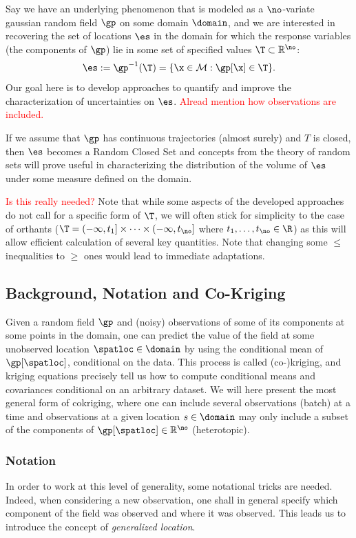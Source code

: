 Say we have an underlying phenomenon that is modeled as a $\no$-variate gaussian random field $\gp$ on some domain $\domain$, 
and we are interested in recovering the set of locations $\es$ in the domain for which the response variables (the components of $\gp$) lie in some set of specified values $\T\subset \mathbb{R}^{\no}$:
$$
\es:=\gp^{-1}(\T)=\{\x \in \mathcal{M}: \gp[\x] \in \T\}.
$$
Our goal here is to develop approaches to quantify and improve the
characterization of uncertainties on $\es$. \textcolor{red}{Alread mention how observations are included.}

If we assume that $\gp$ has
continuous trajectories (almost surely) and $T$ is closed, then
$\es$ becomes a Random Closed Set
\citep{Molchanov2005} and concepts from the theory of random sets will prove useful in characterizing the distribution of the volume of $\es$ under some measure defined on the domain.

\textcolor{red}{Is this really needed?} Note that while some aspects of the developed approaches do not call for a
specific form of $\T$, we will often stick for simplicity to the case
of orthants
($\T=(-\infty, t_1] \times \dots \times (-\infty, t_{\no}]$ where
$t_1,\dots, t_{\no} \in \R$) as this will allow efficient calculation
of several key quantities. Note that changing some $\leq$ inequalities
to $\geq$ ones would lead to immediate adaptations.


\subsection{Background, Notation and Co-Kriging}
\label{sec:bg_and_notation}
Given a random field $\gp$ and (noisy) observations of some of its components at some points in the domain, one can predict the value of the field at some unobserved location $\spatloc\in \domain$ by using the conditional mean of $\gp[\spatloc]$, conditional on the data. This process is called (co-)kriging, and kriging equations precisely tell us how to compute conditional means and covariances conditional on an arbitrary dataset.
We will here present the most general form of cokriging, where one can include several observations (batch) at a time and 
observations at a given location $s \in \domain$ may only include a subset of the components of $\gp[\spatloc]\in\mathbb{R}^{\no}$ 
(heterotopic).

\subsubsection{Notation}
In order to work at this level of generality, some notational tricks are needed. Indeed, when considering a new observation, one shall in general specify which component of the field was observed and where it was observed. This leads us to introduce the concept of \textit{generalized location}.

